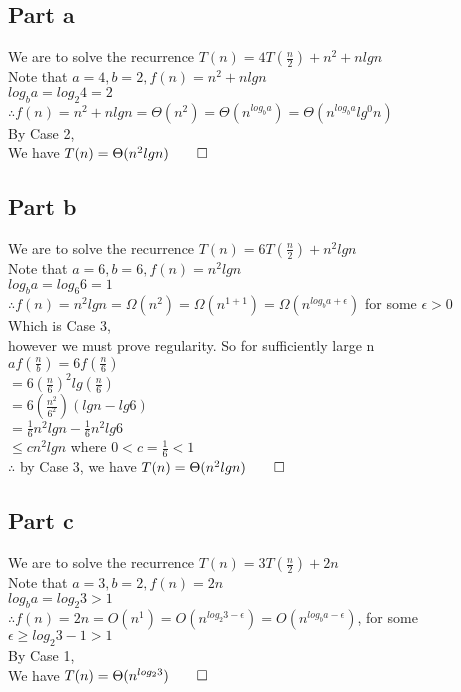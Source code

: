 \documentclass{article}
\begin{document}
      \subsection{Part a}
        We are to solve the recurrence $T(n) = 4T(\frac{n}{2}) + n^{2} + nlgn$ \\
        Note that $a = 4, b = 2, f(n) = n^{2} + nlgn$ \\
        $log_{b}a = log_{2}4 = 2$ \\
        $\therefore f(n) = n^{2} + nlgn = \Theta(n^{2}) = \Theta(n^{log_{b}a}) = \Theta(n^{log_{b}a}lg^{0} n)$ \\
        By Case 2, \\
        We have $T(n) = \Theta(n^{2}lgn) \qed$
      \subsection{Part b}
        We are to solve the recurrence $T(n) = 6T(\frac{n}{2}) + n^{2}lgn$ \\
        Note that $a = 6, b = 6, f(n) = n^{2}lgn$ \\
        $log_{b}a = log_{6}6 = 1$ \\
        $\therefore f(n) = n^{2}lgn = \Omega(n^{2}) = \Omega(n^{1 + 1}) = \Omega(n^{log_{b}a + \epsilon})$ for some $\epsilon > 0$ \\
        Which is Case 3, \\
        however we must prove regularity. So for sufficiently large n \\
        $af(\frac{n}{b}) = 6f(\frac{n}{6})$ \\
        $= 6{(\frac{n}{6})}^{2}lg(\frac{n}{6})$ \\
        $= 6(\frac{n^{2}}{6^{2}})(lgn - lg6)$ \\
        $= \frac{1}{6}n^{2}lgn - \frac{1}{6}n^{2}lg6$ \\
        $\leq cn^{2}lgn$  where $0 < c = \frac{1}{6} < 1$ \\
        $\therefore$ by Case 3, we have $T(n) = \Theta(n^{2}lgn) \qed$
      \subsection{Part c}
        We are to solve the recurrence $T(n) = 3T(\frac{n}{2}) + 2n$ \\
        Note that $a = 3, b = 2, f(n) = 2n$ \\
        $log_{b}a = log_{2}3 > 1$ \\
        $\therefore f(n) = 2n = O(n^{1}) = O(n^{log_{2}3 - \epsilon}) = O(n^{log_{b}a - \epsilon})$, for some $\epsilon \geq log_{2}3 - 1 > 1$\\
        By Case 1, \\
        We have $T(n) = \Theta(n^{log_{2}{3}}) \qed$
\end{document}

